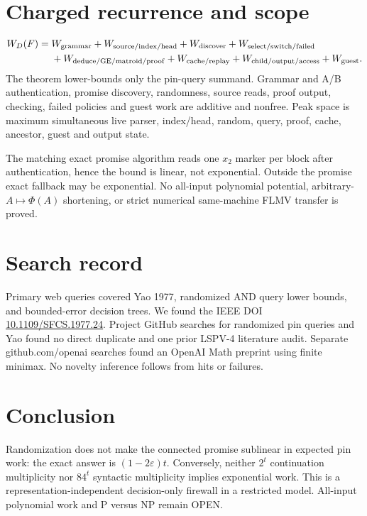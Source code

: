 \documentclass[11pt]{article}
\begin{document}
\section{Charged recurrence and scope}
\[
\begin{split}
W_D(F)={}&W_{\rm grammar}+W_{\rm source/index/head}+W_{\rm discover}
+W_{\rm select/switch/failed}\\
&+W_{\rm deduce/GE/matroid/proof}+W_{\rm cache/replay}
+W_{\rm child/output/access}+W_{\rm guest}.
\end{split}
\]
The theorem lower-bounds only the pin-query summand. Grammar and A/B
authentication, promise discovery, randomness, source reads, proof output,
checking, failed policies and guest work are additive and nonfree. Peak space
is maximum simultaneous live parser, index/head, random, query, proof, cache,
ancestor, guest and output state.

The matching exact promise algorithm reads one $x_2$ marker per block after
authentication, hence the bound is linear, not exponential. Outside the
promise exact fallback may be exponential. No all-input polynomial potential,
arbitrary-$A\mapsto\Phi(A)$ shortening, or strict numerical same-machine FLMV
transfer is proved.

\section{Search record}
Primary web queries covered Yao 1977, randomized AND query lower bounds, and
bounded-error decision trees. We found the IEEE DOI
\href{https://doi.org/10.1109/SFCS.1977.24}{10.1109/SFCS.1977.24}.
Project GitHub searches for randomized pin queries and Yao found no direct
duplicate and one prior LSPV-4 literature audit. Separate github.com/openai
searches found an OpenAI Math preprint using finite minimax. No novelty
inference follows from hits or failures.

\section{Conclusion}
Randomization does not make the connected promise sublinear in expected pin
work: the exact answer is $(1-2\varepsilon)t$. Conversely, neither $2^t$
continuation multiplicity nor $84^t$ syntactic multiplicity implies
exponential work. This is a representation-independent decision-only
firewall in a restricted model. All-input polynomial work and P versus NP
remain OPEN.
\end{document}
